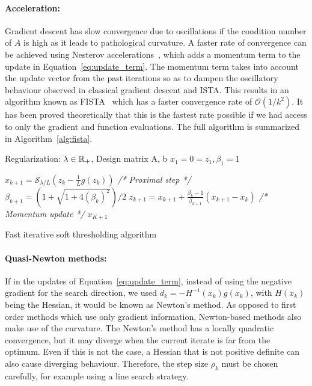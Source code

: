 \paragraph{Acceleration:} Gradient descent has slow convergence due to oscillations if the condition number of $A$ is high as it leads to pathological curvature. A faster rate of convergence can be achieved using Nesterov accelerations~\citep{nesterov1983method}, which adds a momentum term to the update in Equation~\ref{eq:update_term}.
The momentum term takes into account the update vector from the past iterations so as to dampen the oscillatory behaviour observed in classical gradient descent and \ac{ISTA}. 
This results in an algorithm known as \ac{FISTA}~\citep{beck2009fast} which has a faster convergence rate of $\mathcal{O}(1/k^2)$. It has been proved theoretically that this is the fastest rate possible if we had access to only the gradient and function evaluations. The full algorithm is summarized in Algorithm~\ref{alg:fista}.

    \begin{algorithm}[htb]
      \begin{algorithmic}[1] %
      \REQUIRE Regularization: $\lambda \in \mathbb{R}_+$, Design matrix A, b
      \STATE $x_1=0=z_1, \beta_1=1$
          
          \STATE $x_{k+1} = \mathcal{S}_{\lambda/L}(z_k - \frac{1}{L}g(z_k))$ \textit{\color{blue} /* Proximal step */}
          \STATE $\beta_{k+1} = (1 + \sqrt{1 + 4(\beta_k)^2})/2$
          \STATE $z_{k + 1} = x_{k + 1} + \frac{\beta_k - 1}{\beta_{k + 1}}(x_{k + 1} - x_k)$ \textit{\color{blue} /* Momentum update */}
        \ENDFOR
        \RETURN $x_{K + 1}$
        \end{algorithmic}
        \caption{Fast iterative soft thresholding algorithm}
        \label{alg:fista}
    \end{algorithm}


\paragraph{Quasi-Newton methods:}
If in the updates of Equation~\ref{eq:update_term}, instead of using the negative gradient for the search direction, we used $d_k = -H^{-1}(x_k)g(x_k)$, with $H(x_k)$ being the Hessian, it would be known as Newton's method. As opposed to first order methods which use only gradient information, Newton-based methods also make use of the curvature. The Newton's method has a locally quadratic convergence, but it may diverge when the current iterate is far from the optimum. Even if this is not the case, a Hessian that is not positive definite can also cause diverging behaviour. Therefore, the step size $\rho_k$ must be chosen carefully, for example using a line search strategy.

